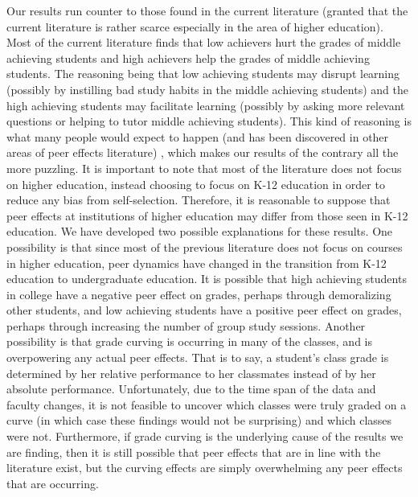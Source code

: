 Our results run counter to those found in the current literature (granted that the current literature is rather scarce especially in the area of higher education). 
Most of the current literature finds that low achievers hurt the grades of middle achieving students and high achievers help the grades of middle achieving students. 
The reasoning being that low achieving students may disrupt learning (possibly by instilling bad study habits in the middle achieving students) and the high achieving students may facilitate learning (possibly by asking more relevant questions or helping to tutor middle achieving students). 
This kind of reasoning is what many people would expect to happen (and has been discovered in other areas of peer effects literature) \citep{griffith2014peer,zimmerman2003peer,sacerdote2000peer}, which makes our results of the contrary all the more puzzling. 
It is important to note that most of the literature does not focus on higher education, instead choosing to focus on K-12 education in order to reduce any bias from self-selection. 
Therefore, it is reasonable to suppose that peer effects at institutions of higher education may differ from those seen in K-12 education. 
We have developed two possible explanations for these results. 
One possibility is that since most of the previous literature does not focus on courses in higher education, peer dynamics have changed in the transition from K-12 education to undergraduate education. 
It is possible that high achieving students in college have a negative peer effect on grades, perhaps through demoralizing other students, and low achieving students have a positive peer effect on grades, perhaps through increasing the number of group study sessions. 
Another possibility is that grade curving is occurring in many of the classes, and is overpowering any actual peer effects. 
That is to say, a student's class grade is determined by her relative performance to her classmates instead of by her absolute performance. 
Unfortunately, due to the time span of the data and faculty changes, it is not feasible to uncover which classes were truly graded on a curve (in which case these findings would not be surprising) and which classes were not. 
Furthermore, if grade curving is the underlying cause of the results we are finding, then it is still possible that peer effects that are in line with the literature exist, but the curving effects are simply overwhelming any peer effects that are occurring. 

